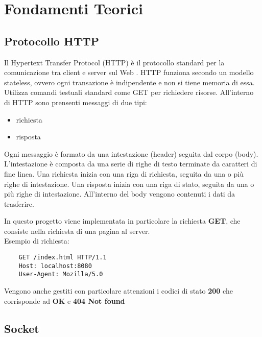 \documentclass[a4paper,12pt]{report}
\begin{document}
\chapter{Fondamenti Teorici}
\section{Protocollo HTTP}
Il Hypertext Transfer Protocol (HTTP) è il protocollo standard per la comunicazione tra client e server sul Web . HTTP funziona secondo
un modello stateless, ovvero ogni transazione è indipendente e non si tiene memoria di essa. Utilizza comandi testuali standard come 
GET per richiedere risorse. All'interno di HTTP sono prensenti messaggi di due tipi:
\begin{itemize}
    \item richiesta
    \item risposta
\end{itemize}
Ogni messaggio è formato da una intestazione (header) seguita dal corpo (body). L'intestazione è composta da una serie di righe di testo
terminate da caratteri di fine linea. Una richiesta inizia con una riga di richiesta, seguita da una o più righe di intestazione. Una 
risposta inizia con una riga di stato, seguita da una o più righe di intestazione. All'interno del body vengono contenuti i dati da 
trasferire. 

In questo progetto viene implementata in particolare la richiesta \textbf{GET}, che consiste nella richiesta di una pagina al server. \\Esempio di 
richiesta:
\begin{verbatim}
    GET /index.html HTTP/1.1
    Host: localhost:8080
    User-Agent: Mozilla/5.0
\end{verbatim}
    
Vengono anche gestiti con particolare attenzioni i codici di stato \textbf{200} che corrisponde ad \textbf{OK} e \textbf{404 Not found}
\section{Socket}
\end{document}
